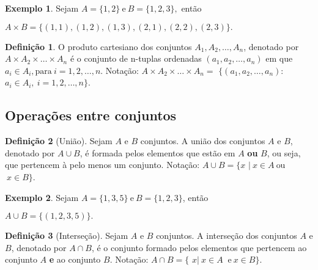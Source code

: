 \documentclass[]{book}
\theoremstyle{definition}
\newtheorem{definition}{Definição}[chapter]
\theoremstyle{definition}
\newtheorem{example}{Exemplo}[chapter]
\theoremstyle{definition}
\theoremstyle{remark}
\begin{document}
\begin{example}
\protect\hypertarget{exm:unnamed-chunk-12}{}{\label{exm:unnamed-chunk-12} }Sejam \(A = \{1,2\} \ \text{e} \ B = \{1,2,3\},\) então

\(A \times B = \{(1,1), (1,2), (1,3), (2,1), (2,2), (2,3)\}.\)
\end{example}

\begin{definition}
\protect\hypertarget{def:defprodcart3}{}{\label{def:defprodcart3} }O produto cartesiano dos conjuntos \(A_1, A_2, \ldots, A_n\), denotado por \(A \times A_2 \times \ldots \times A_n\) é o conjunto de n-tuplas ordenadas \((a_1, a_2, \ldots, a_n)\) em que \(a_i \in A_i, \text{para} \ i=1,2,\ldots,n\).
Notação:
\(A \times A_2 \times \ldots \times A_n =\) \(\{(a_1, a_2, \ldots, a_n):\) \(a_i \in A_i, \ i=1,2,\ldots,n\}\).
\end{definition}

\hypertarget{operauxe7uxf5es-entre-conjuntos}{%
\subsection{Operações entre conjuntos}\label{operauxe7uxf5es-entre-conjuntos}}

\begin{definition}[União]
\protect\hypertarget{def:defunion}{}{\label{def:defunion} \iffalse (União) \fi{} }Sejam \(A\) e \(B\) conjuntos.
A união dos conjuntos \(A\) e \(B\), denotado por \(A \cup B\), é formada pelos elementos que estão em \(A\) \textbf{ou} \(B\), ou seja, que pertencem à pelo menos um conjunto.
Notação: \(A \cup B = \{ x\) \(|\ x \in A \ \mbox{ou}\) \(\ x \in B\}\).
\end{definition}

\begin{example}
\protect\hypertarget{exm:exUniao}{}{\label{exm:exUniao} }Sejam \(A = \{1,3,5\} \ \text{e} \ B = \{1,2,3\}\), então

\(A \cup B = \{(1,2,3,5)\}.\)
\end{example}

\begin{definition}[Interseção]
\protect\hypertarget{def:defintersec}{}{\label{def:defintersec} \iffalse (Interseção) \fi{} }Sejam \(A\) e \(B\) conjuntos.
A interseção dos conjuntos \(A\) e \(B\), denotado por \(A \cap B\), é o conjunto formado pelos elementos que pertencem ao conjunto \(A\) \textbf{e} ao conjunto \(B\).
Notação:
\(A \cap B = \{\) \(x |\ x \in A\) \(\ \mbox{e} \ x \in B\}\).
\end{definition}
\end{document}
